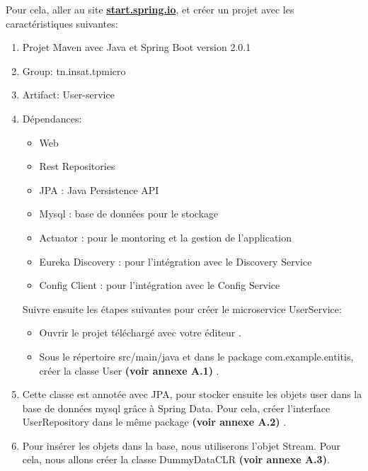 Pour cela, aller au site \underline{\textbf{start.spring.io}}, et créer un projet avec les caractéristiques suivantes:

\begin{enumerate}
       	\item  Projet Maven avec Java et Spring Boot version 2.0.1
		\item  Group: tn.insat.tpmicro
		\item  Artifact: User-service
		\item  Dépendances:
		
		\begin{itemize}
		  \item Web
		  \item Rest Repositories
		  \item JPA : Java Persistence API
		 \item Mysql : base de données pour le stockage
		 \item Actuator : pour le montoring et la gestion de l'application
		 \item  Eureka Discovery : pour l'intégration avec le Discovery Service
		 \item  Config Client : pour l'intégration avec le Config Service
		\end{itemize}
		



Suivre ensuite les étapes suivantes pour créer le microservice UserService:

\begin{itemize}
\item Ouvrir le projet téléchargé avec votre éditeur .

\item Sous le répertoire src/main/java et dans le package com.example.entitis, créer la classe User  \textbf{(voir annexe A.1) }.
\end{itemize}



\item Cette classe est annotée avec JPA, pour stocker ensuite les objets user dans la base de données mysql grâce à Spring Data. Pour cela, créer l'interface UserRepository dans le même package  \textbf{(voir annexe A.2) }. 




\item Pour insérer les objets dans la base, nous utiliserons l'objet Stream. Pour cela, nous allons créer la classe DummyDataCLR \textbf{(voir annexe A.3)}.




\end{enumerate}
